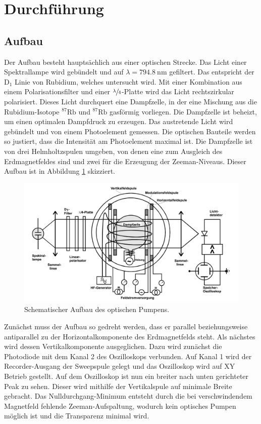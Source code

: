 \section{Durchführung}
\subsection{Aufbau}
\label{sec:Durchführung}
Der Aufbau besteht hauptsächlich aus einer optischen Strecke. Das Licht einer Spektrallampe wird gebündelt und auf $\lambda = \SI{794,8}{\nano \meter}$
gefiltert. Das entspricht der $\text{D}_1$ Linie von Rubidium, welches untersucht wird. Mit einer Kombination aus einem Polarisationsfilter und einer
$\sfrac{\lambda}{4}$-Platte wird das Licht rechtszirkular polarisiert. Dieses Licht durchquert eine Dampfzelle, in der eine Mischung aus die Rubidium-Isotope ${}^{87}\text{Rb}$
und ${}^{87}\text{Rb}$ gasförmig vorliegen. Die Dampfzelle ist beheizt, um einen optimalen Dampfdruck zu erzeugen. Das austretende Licht wird gebündelt
und von einem Photoelement gemessen. Die optischen Bauteile werden so justiert, dass die Intensität am Photoelement maximal ist. Die Dampfzelle ist von drei Helmholtzspulen umgeben, von denen eine zum Ausgleich des Erdmagnetfeldes sind und zwei  für
die Erzeugung der Zeeman-Niveaus. Dieser Aufbau ist in Abbildung \ref{fig:aufbaucom} skizziert.


\begin{figure}
	\centering
	\includegraphics[width=0.8\linewidth]{img/aufbaucom.jpg}
	\caption{Schematischer Aufbau des optischen Pumpens.\cite{V21}}
	\label{fig:aufbaucom}
\end{figure}

Zunächst muss der Aufbau so gedreht werden, dass er parallel beziehungsweise antiparallel zu der Horizontalkomponente des Erdmagnetfelds steht. Als nächstes wird dessen Vertikalkomponente ausgeglichen. Dazu wird zunächst die Photodiode mit dem Kanal 2 des Oszilloskops verbunden. Auf Kanal 1 wird der Recorder-Ausgang der Sweepspule gelegt und das Oszilloskop wird auf XY Betrieb gestellt. Auf dem Oszilloskop ist nun ein breiter nach unten gerichteter Peak zu sehen. Dieser wird mithilfe der Vertikalspule auf minimale Breite gebracht. Das Nulldurchgang-Minimum entsteht durch die bei verschwindendem Magnetfeld fehlende Zeeman-Aufspaltung, wodurch kein optisches Pumpen möglich ist und die Transparenz minimal wird.

